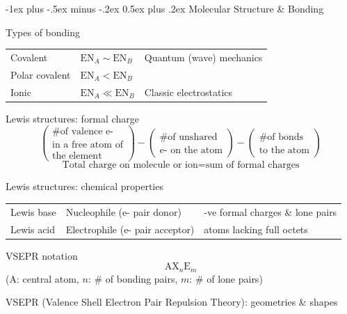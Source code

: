 \documentclass[10pt,landscape]{article}
\makeatletter
\renewcommand{\section}{\@startsection{section}{1}{0mm}%
                                {-1ex plus -.5ex minus -.2ex}%
                                {0.5ex plus .2ex}%
                                {\normalfont\large\bfseries}}
\newcommand{\extraline}{\vspace{1em}}
\newcommand{\tableindent}{\hspace{1.5em}}
\makeatother
\begin{document}
\begin{multicols}{3}
\hrulefill

\section{Molecular Structure \& Bonding}

Types of bonding 

\begin{tabular}{@{\tableindent}llp{26mm}<{\raggedright}@{}}
	Covalent & $\text{EN}_A \sim  \text{EN}_B$ & Quantum (wave) mechanics \\
	Polar covalent & $\text{EN}_A < \text{EN}_B$ & \\
	Ionic & $\text{EN}_A \ll  \text{EN}_B$ &  Classic electrostatics \\
\end{tabular}

Lewis structures: formal charge
\[
\begin{pmatrix}
	 \text{\# of valence e-} \\
	 \text{in a free atom of} \\
	  \text{the element}
\end{pmatrix}
-
\begin{pmatrix}
	\text{\# of unshared} \\
	\text{e- on the atom} 
\end{pmatrix}
-
\begin{pmatrix}
	\text{\# of bonds} \\
	\text{to the atom} 
\end{pmatrix}
\]
\[ \text{Total charge on molecule or ion} = \text{sum of formal charges} \]

\extraline

Lewis structures: chemical properties

\begin{tabular}{@{\tableindent}lp{2.45cm}<{\raggedright}p{2.6cm}<{\raggedright}@{}}
Lewis base & Nucleophile (e- pair donor) & -ve formal charges \& lone pairs \\
Lewis acid & Electrophile (e- pair acceptor) & atoms lacking full octets
\end{tabular}
\extraline

VSEPR notation
\[ \text{AX}_n\text{E}_m \]
\tableindent (A: central atom, $n$: \# of bonding pairs, $m$: \# of lone pairs) \\
\extraline


VSEPR (Valence Shell Electron Pair Repulsion Theory): geometries \& shapes


\end{multicols}
\end{document}
